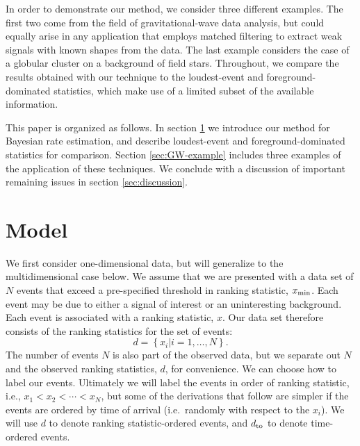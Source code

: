 \documentclass[aps,prd]{revtex4-1}
\newcommand{\mathset}[1]{\left\{ #1 \right\}}
\begin{document}
In order to demonstrate our method, we consider three different
examples.  The first two come from the field of gravitational-wave
data analysis, but could equally arise in any application that employs
matched filtering \cite{findchirppaper} to extract weak signals with
known shapes from the data.  The last example considers the case of a
globular cluster on a background of field stars.  Throughout, we
compare the results obtained with our technique to the loudest-event
and foreground-dominated statistics, which make use of a limited
subset of the available information.

This paper is organized as follows.  In section \ref{sec:model} we
introduce our method for Bayesian rate estimation, and describe
loudest-event and foreground-dominated statistics for comparison.
Section \ref{sec:GW-example} includes three examples of the
application of these techniques.  We conclude with a discussion of
important remaining issues in section \ref{sec:discussion}.




\section{Model}\label{sec:model}

We first consider one-dimensional data, but will generalize to the
multidimensional case below.  We assume that we are presented with a
data set of $N$ events that exceed a pre-specified threshold in
ranking statistic, $x_{\rm min}$.  Each event may be due to either a
signal of interest or an uninteresting background.  Each event is
associated with a ranking statistic, $x$.  Our data set therefore
consists of the ranking statistics for the set of events:
\begin{equation}
  d = \mathset{ x_i | i = 1, \ldots, N } .
\end{equation}
The number of events $N$ is also part of the observed data, but we
separate out $N$ and the observed ranking statistics, $d$, for
convenience. We can choose how to label our events. Ultimately we will
label the events in order of ranking statistic, i.e., $x_1 < x_2 <
\cdots < x_N$, but some of the derivations that follow are simpler if
the events are ordered by time of arrival (i.e.\ randomly with respect
to the $x_i$). We will use $d$ to denote ranking statistic-ordered
events, and $d_{\rm to}$ to denote time-ordered events.
\end{document}
